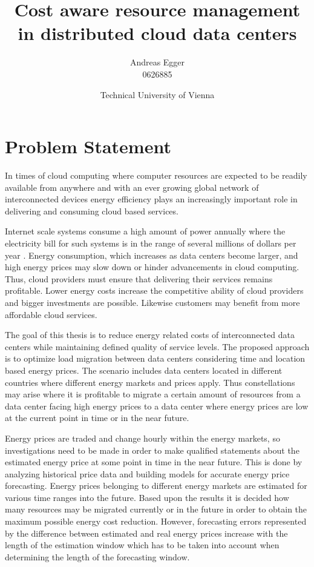 \documentclass[a4paper]{article}
\title{Cost aware resource management in distributed cloud data centers}
\author{Andreas Egger \\0626885}
\date{Technical University of Vienna}
\begin{document}
\maketitle


\section{Problem Statement}

In times of cloud computing where computer resources are expected to be readily available from anywhere \cite{buyya2009cloud} and with an ever growing global network of interconnected devices energy efficiency plays an increasingly important role in delivering and consuming cloud based services. 

Internet scale systems consume a high amount of power annually where the electricity bill for such systems is in the range of several millions of dollars per year \cite{qureshi2009cutting}. Energy consumption, which increases as data centers become larger, and high energy prices may slow down or hinder advancements in cloud computing. Thus, cloud providers must ensure that delivering their services remains profitable. Lower energy costs increase the competitive ability of cloud providers and bigger investments are possible. Likewise customers may benefit from more affordable cloud services. 

The goal of this thesis is to reduce energy related costs of interconnected data centers while maintaining defined quality of service levels. The proposed approach is to optimize load migration between data centers considering time and location based energy prices. The scenario includes data centers located in different countries where different energy markets and prices apply. Thus constellations may arise where it is profitable to migrate a certain amount of resources from a data center facing high energy prices to a data center where energy prices are low at the current point in time or in the near future. 

Energy prices are traded and change hourly within the energy markets, so investigations need to be made in order to make qualified statements about the estimated energy price at some point in time in the near future.
This is done by analyzing historical price data and building models for accurate energy price forecasting. Energy prices belonging to different energy markets are estimated for various time ranges into the future. Based upon the results it is decided how many resources may be migrated currently or in the future in order to obtain the maximum possible energy cost reduction. 
However, forecasting errors represented by the difference between estimated and real energy prices increase with the length of the estimation window which has to be taken into account when determining the length of the forecasting window. 
\end{document}
